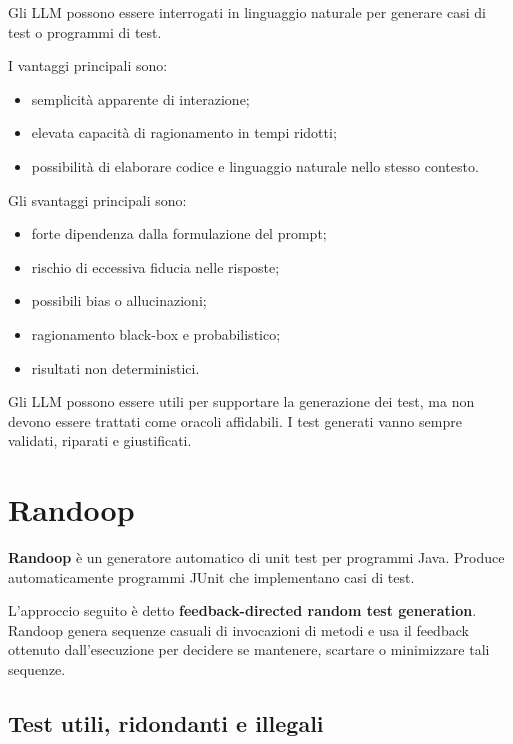 Gli LLM possono essere interrogati in linguaggio naturale per generare casi di test o programmi di test.

I vantaggi principali sono:

\begin{itemize}
    \item semplicità apparente di interazione;
    \item elevata capacità di ragionamento in tempi ridotti;
    \item possibilità di elaborare codice e linguaggio naturale nello stesso contesto.
\end{itemize}

Gli svantaggi principali sono:

\begin{itemize}
    \item forte dipendenza dalla formulazione del prompt;
    \item rischio di eccessiva fiducia nelle risposte;
    \item possibili bias o allucinazioni;
    \item ragionamento black-box e probabilistico;
    \item risultati non deterministici.
\end{itemize}

\begin{notaesame}
Gli LLM possono essere utili per supportare la generazione dei test, ma non devono essere trattati come oracoli affidabili. I test generati vanno sempre validati, riparati e giustificati.
\end{notaesame}

\section{Randoop}

\textbf{Randoop} è un generatore automatico di unit test per programmi Java. Produce automaticamente programmi JUnit che implementano casi di test.

L'approccio seguito è detto \textbf{feedback-directed random test generation}. Randoop genera sequenze casuali di invocazioni di metodi e usa il feedback ottenuto dall'esecuzione per decidere se mantenere, scartare o minimizzare tali sequenze.

\subsection{Test utili, ridondanti e illegali}


